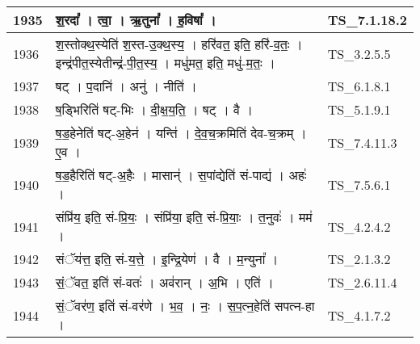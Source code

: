 \documentclass[17pt]{extarticle}
\begin{document}
\begin{longtable}{||p{0.4in}||p{4.9in}||p{0.9in}||}
    \hline
        
    1935 & श॒रदा᳚   ।   त्वा॒   ।   ऋ॒तुना᳚   ।   ह॒विषा᳚   ।    & TS\_7.1.18.2       \\
    
    \hline
        
    1936 & श॒स्तोक्थ॒स्येति॑ श॒स्त{-}उ॒क्थ॒स्य॒   ।   हरि॑वत॒ इति॒ हरि॑{-}व॒तः॒   ।   इन्द्र॑पीत॒स्येतीन्द्र॑{-}पी॒त॒स्य॒   ।   मधु॑मत॒ इति॒ मधु॑{-}म॒तः॒   ।    & TS\_3.2.5.5       \\
    
    \hline
        
    1937 & षट्   ।   प॒दानि॑   ।   अनु॑   ।   नीति॑   ।    & TS\_6.1.8.1       \\
    
    \hline
        
    1938 & ष॒ड्भिरिति॑ षट्{-}भिः   ।   दी॒क्ष॒य॒ति॒   ।   षट्   ।   वै   ।    & TS\_5.1.9.1       \\
    
    \hline
        
    1939 & ष॒ड॒हेनेति॑ षट्{-}अ॒हेन॑   ।   यन्ति॑   ।   दे॒व॒च॒क्रमिति॑ देव{-}च॒क्रम्   ।   ए॒व   ।    & TS\_7.4.11.3       \\
    
    \hline
        
    1940 & ष॒ड॒हैरिति॑ षट्{-}अ॒हैः   ।   मासान्॑   ।   स॒पांद्येति॑ सं{-}पाद्य॑   ।   अहः॑   ।    & TS\_7.5.6.1       \\
    
    \hline
        
    1941 & संप्रि॑य॒ इति॒ सं{-}प्रि॒यः॒   ।   संप्रि॑या॒ इति॒ सं{-}प्रि॒याः॒   ।   त॒नुवः॑   ।   मम॑   ।    & TS\_4.2.4.2       \\
    
    \hline
        
    1942 & संॅय॑त्त॒ इति॒ सं{-}य॒त्ते॒   ।   इ॒न्द्रि॒येण॑   ।   वै   ।   म॒न्युना᳚   ।    & TS\_2.1.3.2       \\
    
    \hline
        
    1943 & सं॒ॅवत॒ इति॑ सं{-}वतः॑   ।   अव॑रान्   ।   अ॒भि   ।   एति॑   ।    & TS\_2.6.11.4       \\
    
    \hline
        
    1944 & सं॒ॅवर॑ण॒ इति॑ सं{-}वर॑णे   ।   भ॒व॒   ।   नः॒   ।   स॒प॒त्न॒हेति॑ सपत्न{-}हा   ।    & TS\_4.1.7.2       \\
    

\end{longtable}
\end{document}
